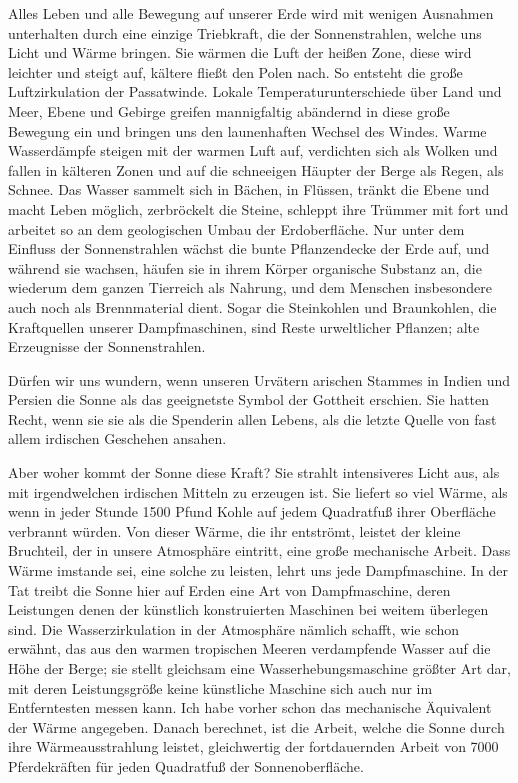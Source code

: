 \documentclass[a4paper, 11pt, oneside, german]{article}
\begin{document}
Alles Leben und alle Bewegung auf unserer Erde wird mit wenigen Ausnahmen unterhalten durch eine einzige Triebkraft, die der Sonnenstrahlen, welche uns Licht und Wärme bringen. Sie wärmen die Luft der heißen Zone, diese wird leichter und steigt auf, kältere fließt den Polen nach. So entsteht die große Luftzirkulation der Passatwinde. Lokale Temperaturunterschiede über Land und Meer, Ebene und Gebirge greifen mannigfaltig abändernd in diese große Bewegung ein und bringen uns den launenhaften Wechsel des Windes. Warme Wasserdämpfe steigen mit der warmen Luft auf, verdichten sich als Wolken und fallen in kälteren Zonen und auf die schneeigen Häupter der Berge als Regen, als Schnee. Das Wasser sammelt sich in Bächen, in Flüssen, tränkt die Ebene und macht Leben möglich, zerbröckelt die Steine, schleppt ihre Trümmer mit fort und arbeitet so an dem geologischen Umbau der Erdoberfläche. Nur unter dem Einfluss der Sonnenstrahlen wächst die bunte Pflanzendecke der Erde auf, und während sie wachsen, häufen sie in ihrem Körper organische Substanz an, die wiederum dem ganzen Tierreich als Nahrung, und dem Menschen insbesondere auch noch als Brennmaterial dient. Sogar die Steinkohlen und Braunkohlen, die Kraftquellen unserer Dampfmaschinen, sind Reste urweltlicher Pflanzen; alte Erzeugnisse der Sonnenstrahlen.

Dürfen wir uns wundern, wenn unseren Urvätern arischen Stammes in Indien und Persien die Sonne als das geeignetste Symbol der Gottheit erschien. Sie hatten Recht, wenn sie sie als die Spenderin allen Lebens, als die letzte Quelle von fast allem irdischen Geschehen ansahen.

Aber woher kommt der Sonne diese Kraft? Sie strahlt intensiveres Licht aus, als mit irgendwelchen irdischen Mitteln zu erzeugen ist. Sie liefert so viel Wärme, als wenn in jeder Stunde 1500 Pfund Kohle auf jedem Quadratfuß ihrer Oberfläche verbrannt würden. Von dieser Wärme, die ihr entströmt, leistet der kleine Bruchteil, der in unsere Atmosphäre eintritt, eine große mechanische Arbeit. Dass Wärme imstande sei, eine solche zu leisten, lehrt uns jede Dampfmaschine. In der Tat treibt die Sonne hier auf Erden eine Art von Dampfmaschine, deren Leistungen denen der künstlich konstruierten Maschinen bei weitem überlegen sind. Die Wasserzirkulation in der Atmosphäre nämlich schafft, wie schon erwähnt, das aus den warmen tropischen Meeren verdampfende Wasser auf die Höhe der Berge; sie stellt gleichsam eine Wasserhebungsmaschine größter Art dar, mit deren Leistungsgröße keine künstliche Maschine sich auch nur im Entferntesten messen kann. Ich habe vorher schon das mechanische Äquivalent der Wärme angegeben. Danach berechnet, ist die Arbeit, welche die Sonne durch ihre Wärmeausstrahlung leistet, gleichwertig der fortdauernden Arbeit von 7000 Pferdekräften für jeden Quadratfuß der Sonnenoberfläche.
\end{document}
